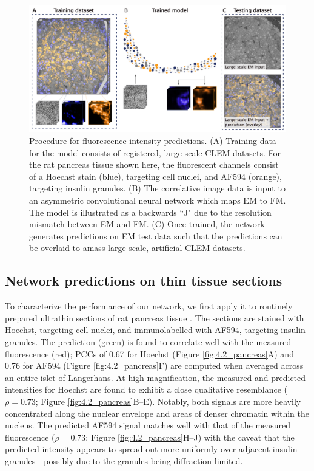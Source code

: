 \begin{figure}[!tb]
    \centering
    \includegraphics[width=\linewidth]{chapter-4/figures_PDF/fig4-1_overview.pdf}
    \caption{Procedure for fluorescence intensity predictions.
    (A) Training data for the model consists of registered, large-scale CLEM datasets. For the rat pancreas tissue shown here, the fluorescent channels consist of a Hoechst stain (blue), targeting cell nuclei, and AF594 (orange), targeting insulin granules.
    (B) The correlative image data is input to an asymmetric convolutional neural network which maps EM to FM. The model is illustrated as a backwards ``J" due to the resolution mismatch between EM and FM.
    (C) Once trained, the network generates predictions on EM test data such that the predictions can be overlaid to amass large-scale, artificial CLEM datasets.}
    \label{fig:4.1_overview}
\end{figure}


\subsection{Network predictions on thin tissue sections}
\label{sec:4results_pancreas}

To characterize the performance of our network, we first apply it to routinely prepared ultrathin sections of rat pancreas tissue \cite{ravelli2013destruction}. The sections are stained with Hoechst, targeting cell nuclei, and immunolabelled with AF594, targeting insulin granules. The prediction (green) is found to correlate well with the measured fluorescence (red); PCCs of 0.67 for Hoechst (Figure \ref{fig:4.2_pancreas}A) and 0.76 for AF594 (Figure \ref{fig:4.2_pancreas}F) are computed when averaged across an entire islet of Langerhans. At high magnification, the measured and predicted intensities for Hoechst are found to exhibit a close qualitative resemblance ($\rho\!=\! \text{0.73}$; Figure \ref{fig:4.2_pancreas}B--E). Notably, both signals are more heavily concentrated along the nuclear envelope and areas of denser chromatin within the nucleus. The predicted AF594 signal matches well with that of the measured fluorescence ($\rho\!=\!\text{0.73}$; Figure \ref{fig:4.2_pancreas}H--J) with the caveat that the predicted intensity appears to spread out more uniformly over adjacent insulin granules---possibly due to the granules being diffraction-limited.

